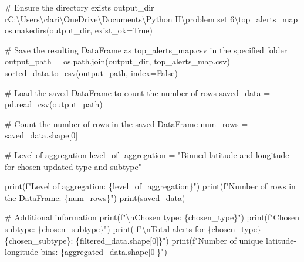 \documentclass[
  letterpaper,
  DIV=11,
  numbers=noendperiod]{scrartcl}
\newenvironment{Shaded}{\begin{snugshade}}{\end{snugshade}}
\newcommand{\BuiltInTok}[1]{\textcolor[rgb]{0.00,0.23,0.31}{#1}}
\newcommand{\CharTok}[1]{\textcolor[rgb]{0.13,0.47,0.30}{#1}}
\newcommand{\CommentTok}[1]{\textcolor[rgb]{0.37,0.37,0.37}{#1}}
\newcommand{\DecValTok}[1]{\textcolor[rgb]{0.68,0.00,0.00}{#1}}
\newcommand{\NormalTok}[1]{\textcolor[rgb]{0.00,0.23,0.31}{#1}}
\newcommand{\OperatorTok}[1]{\textcolor[rgb]{0.37,0.37,0.37}{#1}}
\newcommand{\SpecialCharTok}[1]{\textcolor[rgb]{0.37,0.37,0.37}{#1}}
\newcommand{\SpecialStringTok}[1]{\textcolor[rgb]{0.13,0.47,0.30}{#1}}
\newcommand{\StringTok}[1]{\textcolor[rgb]{0.13,0.47,0.30}{#1}}
\newcommand{\VariableTok}[1]{\textcolor[rgb]{0.07,0.07,0.07}{#1}}
\newcommand{\VerbatimStringTok}[1]{\textcolor[rgb]{0.13,0.47,0.30}{#1}}
\begin{document}
\begin{Shaded}
\begin{Highlighting}[]
\CommentTok{\# Ensure the directory exists}
\NormalTok{output\_dir }\OperatorTok{=} \VerbatimStringTok{r\textquotesingle{}C:\textbackslash{}Users\textbackslash{}clari\textbackslash{}OneDrive\textbackslash{}Documents\textbackslash{}Python II\textbackslash{}problem set 6\textbackslash{}top\_alerts\_map\textquotesingle{}}
\NormalTok{os.makedirs(output\_dir, exist\_ok}\OperatorTok{=}\VariableTok{True}\NormalTok{)}

\CommentTok{\# Save the resulting DataFrame as \textquotesingle{}top\_alerts\_map.csv\textquotesingle{} in the specified folder}
\NormalTok{output\_path }\OperatorTok{=}\NormalTok{ os.path.join(output\_dir, }\StringTok{\textquotesingle{}top\_alerts\_map.csv\textquotesingle{}}\NormalTok{)}
\NormalTok{sorted\_data.to\_csv(output\_path, index}\OperatorTok{=}\VariableTok{False}\NormalTok{)}

\CommentTok{\# Load the saved DataFrame to count the number of rows}
\NormalTok{saved\_data }\OperatorTok{=}\NormalTok{ pd.read\_csv(output\_path)}

\CommentTok{\# Count the number of rows in the saved DataFrame}
\NormalTok{num\_rows }\OperatorTok{=}\NormalTok{ saved\_data.shape[}\DecValTok{0}\NormalTok{]}

\CommentTok{\# Level of aggregation}
\NormalTok{level\_of\_aggregation }\OperatorTok{=} \StringTok{"Binned latitude and longitude for chosen updated type and subtype"}

\BuiltInTok{print}\NormalTok{(}\SpecialStringTok{f"Level of aggregation: }\SpecialCharTok{\{}\NormalTok{level\_of\_aggregation}\SpecialCharTok{\}}\SpecialStringTok{"}\NormalTok{)}
\BuiltInTok{print}\NormalTok{(}\SpecialStringTok{f"Number of rows in the DataFrame: }\SpecialCharTok{\{}\NormalTok{num\_rows}\SpecialCharTok{\}}\SpecialStringTok{"}\NormalTok{)}
\BuiltInTok{print}\NormalTok{(saved\_data)}

\CommentTok{\# Additional information}
\BuiltInTok{print}\NormalTok{(}\SpecialStringTok{f"}\CharTok{\textbackslash{}n}\SpecialStringTok{Chosen type: }\SpecialCharTok{\{}\NormalTok{chosen\_type}\SpecialCharTok{\}}\SpecialStringTok{"}\NormalTok{)}
\BuiltInTok{print}\NormalTok{(}\SpecialStringTok{f"Chosen subtype: }\SpecialCharTok{\{}\NormalTok{chosen\_subtype}\SpecialCharTok{\}}\SpecialStringTok{"}\NormalTok{)}
\BuiltInTok{print}\NormalTok{(}
    \SpecialStringTok{f"}\CharTok{\textbackslash{}n}\SpecialStringTok{Total alerts for }\SpecialCharTok{\{}\NormalTok{chosen\_type}\SpecialCharTok{\}}\SpecialStringTok{ {-} }\SpecialCharTok{\{}\NormalTok{chosen\_subtype}\SpecialCharTok{\}}\SpecialStringTok{: }\SpecialCharTok{\{}\NormalTok{filtered\_data}\SpecialCharTok{.}\NormalTok{shape[}\DecValTok{0}\NormalTok{]}\SpecialCharTok{\}}\SpecialStringTok{"}\NormalTok{)}
\BuiltInTok{print}\NormalTok{(}\SpecialStringTok{f"Number of unique latitude{-}longitude bins: }\SpecialCharTok{\{}\NormalTok{aggregated\_data}\SpecialCharTok{.}\NormalTok{shape[}\DecValTok{0}\NormalTok{]}\SpecialCharTok{\}}\SpecialStringTok{"}\NormalTok{)}
\end{Highlighting}
\end{Shaded}
\end{document}
